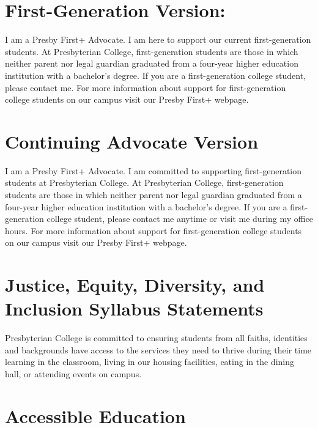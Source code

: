 \documentclass[
]{book}
\begin{document}
\hypertarget{first-generation-version}{%
\section{First-Generation Version:}\label{first-generation-version}}

I am a Presby First+ Advocate. I am here to support our current first-generation students. At Presbyterian College, first-generation students are those in which neither parent nor legal guardian graduated from a four-year higher education institution with a bachelor's degree. If you are a first-generation college student, please contact me. For more information about support for first-generation college students on our campus visit our Presby First+ webpage.

\hypertarget{continuing-advocate-version}{%
\section{Continuing Advocate Version}\label{continuing-advocate-version}}

I am a Presby First+ Advocate. I am committed to supporting first-generation students at Presbyterian College. At Presbyterian College, first-generation students are those in which neither parent nor legal guardian graduated from a four-year higher education institution with a bachelor's degree. If you are a first-generation college student, please contact me anytime or visit me during my office hours. For more information about support for first-generation college students on our campus visit our Presby First+ webpage.

\hypertarget{justice-equity-diversity-and-inclusion-syllabus-statements}{%
\section{Justice, Equity, Diversity, and Inclusion Syllabus Statements}\label{justice-equity-diversity-and-inclusion-syllabus-statements}}

Presbyterian College is committed to ensuring students from all faiths, identities and backgrounds have access to the services they need to thrive during their time learning in the classroom, living in our housing facilities, eating in the dining hall, or attending events on campus.

\hypertarget{accessible-education}{%
\section{Accessible Education}\label{accessible-education}}
\end{document}
